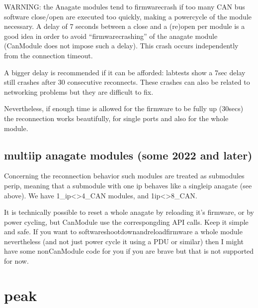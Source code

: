 \documentclass[a4paper,10pt,english]{sphinxmanual}
\begin{document}
\sphinxAtStartPar
WARNING: the Anagate modules tend to firmware\sphinxhyphen{}crash if too many CAN bus software close/open are
executed too quickly, making a power\sphinxhyphen{}cycle of the module necessary. A delay of 7 seconds
between a close and a (re\sphinxhyphen{})open per module is a good idea in order to avoid
“firmware\sphinxhyphen{}crashing” of the anagate module (CanModule does not impose such a delay).
This crash occurs independently from the connection timeout.

\sphinxAtStartPar
A bigger delay is recommended if it can be afforded: lab\sphinxhyphen{}tests show a 7sec delay still crashes
after 30 consecutive reconnects. These crashes can also be related to networking problems but
they are difficult to fix.

\sphinxAtStartPar
Nevertheless, if enough time is allowed for the firmware to be fully up (30secs) the reconnection
works beautifully, for single ports and also for the whole module.


\subsection{multi\sphinxhyphen{}ip anagate modules (some 2022 and later)}
\label{\detokenize{reconnection:multi-ip-anagate-modules-some-2022-and-later}}
\sphinxAtStartPar
Concerning the reconnection behavior such modules are treated as submodules per\sphinxhyphen{}ip, meaning that a sub\sphinxhyphen{}module with one ip
behaves like a single\sphinxhyphen{}ip anagate (see above). We have 1\_ip\textless{}\sphinxhyphen{}\textgreater{}4\_CAN modules, and 1\sphinxhyphen{}ip\textless{}\sphinxhyphen{}\textgreater{}8\_CAN.

\sphinxAtStartPar
It is technically possible to reset a whole anagate by reloading
it’s firmware, or by power cycling, but CanModule  use the correspongding API calls. Keep it simple and safe.
If you want to software\sphinxhyphen{}shoot\sphinxhyphen{}down\sphinxhyphen{}and\sphinxhyphen{}reload\sphinxhyphen{}firmware a whole module nevertheless
(and not just power cycle it using a PDU or similar) then I might have some non\sphinxhyphen{}CanModule code for you if
you are brave \sphinxhyphen{} but that is not supported for now.


\section{peak}
\label{\detokenize{reconnection:peak}}
\end{document}

